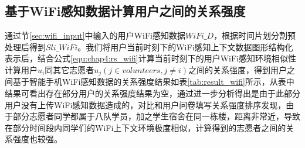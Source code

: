 \subsection{基于WiFi感知数据计算用户之间的关系强度}
通过节\ref{sec:wifi_input}中输入的用户WiFi感知数据$WiFi\_D$，根据时间片划分割预处理后得到$Sli\_WiFi$。我们将用户当前时刻下的WiFi感知上下文数据图形结构化表示后，结合公式\ref{equ:chap4:rs_wifi}计算当前时刻下的用户WiFi感知环境相似性计算用户$u_{i}$同其它志愿者$u_{j}(j \in volunteers, j \neq i)$之间的关系强度，得到用户之间基于智能手机WiFi感知数据的关系强度结果如表\ref{tab:result_wifi}所示，从表中结果可看出存在部分用户的关系强度结果为空，通过进一步分析得出是由于此部分用户没有上传WiFi感知数据造成的，对比和用户问卷填写关系强度排序发现，由于部分志愿者同学都属于八队学员，加之学生宿舍在同一栋楼，距离非常近，导致在部分时间段内同学们的WiFi上下文环境极度相似，计算得到的志愿者之间的关系强度也较强。
